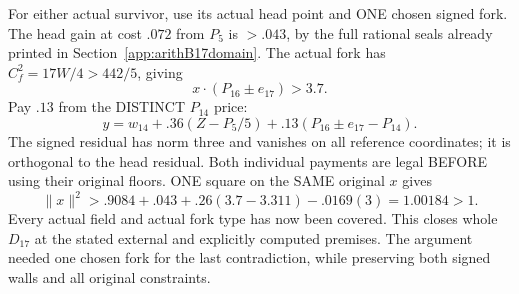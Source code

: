 For either actual survivor, use its actual
head point and ONE chosen signed fork.
The head gain at cost \(.072\) from \(P_5\)
is \(>.043\), by the full rational seals already
printed in Section~\ref{app:arithB17domain}.
The actual fork has
\(C_f^2=17W/4>442/5\), giving
\[
                 x\cdot(P_{16}\pm e_{17})>3.7 .
\]
Pay \(.13\) from the DISTINCT \(P_{14}\) price:
\[
             y=w_{14}+.36(Z-P_5/5)
                          +.13(P_{16}\pm e_{17}-P_{14}).
\]
The signed residual has norm three and
vanishes on all reference coordinates;
it is orthogonal to the head residual.
Both individual payments are legal BEFORE
using their original floors.
ONE square on the SAME original \(x\) gives
\[
              \|x\|^2>.9084+.043+.26(3.7-3.311)-.0169(3)
                                     =1.00184>1 .
\]
Every actual field and actual fork type has
now been covered.
This closes whole \(D_{17}\) at the stated
external and explicitly computed premises.
The argument needed one chosen fork for the
last contradiction, while preserving both
signed walls and all original constraints.




























